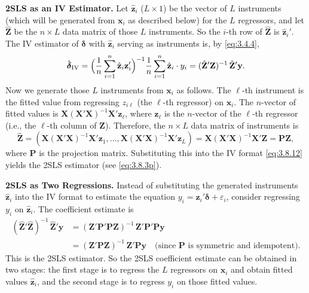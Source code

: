 \medskip\noindent\textbf{2SLS as an IV Estimator.}\enspace
Let $\hat{\mathbf{z}}_i$ ($L \times 1$) be the vector of $L$ instruments (which will be generated from
$\mathbf{x}_i$ as described below) for the $L$ regressors, and let $\hat{\mathbf{Z}}$ be the $n \times L$
data matrix of those $L$ instruments.  So the $i$-th row of $\hat{\mathbf{Z}}$ is
$\hat{\mathbf{z}}_i'$.  The IV estimator of $\boldsymbol{\delta}$ with $\hat{\mathbf{z}}_i$ serving as
instruments is, by \eqref{eq:3.4.4},
\begin{equation}
  \hat{\boldsymbol{\delta}}_{\text{IV}}
  = \Bigl(\frac{1}{n} \sum_{i=1}^{n}
    \hat{\mathbf{z}}_i \mathbf{z}_i'\Bigr)^{-1}
    \frac{1}{n} \sum_{i=1}^{n} \hat{\mathbf{z}}_i \cdot y_i
  = (\hat{\mathbf{Z}}'\mathbf{Z})^{-1}\, \hat{\mathbf{Z}}'\mathbf{y}.
  \label{eq:3.8.12}
\end{equation}
Now we generate those $L$ instruments from $\mathbf{x}_i$ as follows.  The $\ell$-th instrument is
the fitted value from regressing $z_{i\ell}$ (the $\ell$-th regressor) on $\mathbf{x}_i$.  The $n$-vector
of fitted values is $\mathbf{X}(\mathbf{X}'\mathbf{X})^{-1}\mathbf{X}'\mathbf{z}_\ell$, where
$\mathbf{z}_\ell$ is the $n$-vector of the $\ell$-th regressor (i.e., the $\ell$-th column of $\mathbf{Z}$).
Therefore, the $n \times L$ data matrix of instruments is
\begin{equation}
  \hat{\mathbf{Z}}
  = (\mathbf{X}(\mathbf{X}'\mathbf{X})^{-1}\mathbf{X}'\mathbf{z}_1, \ldots,
     \mathbf{X}(\mathbf{X}'\mathbf{X})^{-1}\mathbf{X}'\mathbf{z}_L)
  = \mathbf{X}(\mathbf{X}'\mathbf{X})^{-1}\mathbf{X}'\mathbf{Z}
  = \mathbf{P}\mathbf{Z},
  \label{eq:3.8.13}
\end{equation}
where $\mathbf{P}$ is the projection matrix.  Substituting this into the IV format
\eqref{eq:3.8.12} yields the 2SLS estimator (see \eqref{eq:3.8.3p}).

\medskip\noindent\textbf{2SLS as Two Regressions.}\enspace
Instead of substituting the generated instruments $\hat{\mathbf{z}}_i$ into the IV format to estimate
the equation $y_i = \mathbf{z}_i' \boldsymbol{\delta} + \varepsilon_i$, consider regressing $y_i$ on
$\hat{\mathbf{z}}_i$.  The coefficient estimate is
\begin{align*}
  (\hat{\mathbf{Z}}'\hat{\mathbf{Z}})^{-1}\, \hat{\mathbf{Z}}'\mathbf{y}
  &= (\mathbf{Z}'\mathbf{P}'\mathbf{P}\mathbf{Z})^{-1}\,
     \mathbf{Z}'\mathbf{P}'\mathbf{P}\mathbf{y} \\
  &= (\mathbf{Z}'\mathbf{P}\mathbf{Z})^{-1}\, \mathbf{Z}'\mathbf{P}\mathbf{y}
  \quad \text{(since $\mathbf{P}$ is symmetric and idempotent)}.
\end{align*}
This is the 2SLS estimator.  So the 2SLS coefficient estimate can be obtained in two
stages: the first stage is to regress the $L$ regressors on $\mathbf{x}_i$ and obtain fitted values
$\hat{\mathbf{z}}_i$, and the second stage is to regress $y_i$ on those fitted values.

